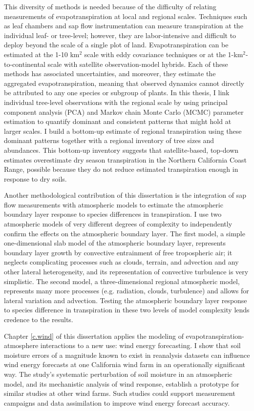 This diversity of methods is needed because of the difficulty of relating measurements of evapotranspiration at local and regional scales.  Techniques such as leaf chambers and sap flow instrumentation can measure transpiration at the individual leaf- or tree-level; however, they are labor-intensive and difficult to deploy beyond the scale of a single plot of land.  Evapotranspiration can be estimated at the 1-10 km$^2$ scale with eddy covariance techniques or at the 1-km$^2$-to-continental scale with satellite observation-model hybrids.  Each of these methods has associated uncertainties, and moreover, they estimate the aggregated evapotranspiration, meaning that observed dynamics cannot directly be attributed to any one species or subgroup of plants.  In this thesis, I link individual tree-level observations with the regional  scale by using principal component analysis (PCA) and Markov chain Monte Carlo (MCMC) parameter estimation to quantify dominant and consistent patterns that might hold at larger scales.  I build a bottom-up estimate of regional transpiration using these dominant patterns together with a regional inventory of tree sizes and abundances.  This bottom-up inventory suggests that satellite-based, top-down estimates overestimate dry season transpiration in the Northern California Coast Range, possible because they do not reduce estimated transpiration enough in response to dry soils.

Another methodological contribution of this dissertation is the integration of sap flow measurements with atmospheric models to estimate the atmospheric boundary layer response to species differences in transpiration.  I use two atmospheric models of very different degrees of complexity to independently confirm the effects on the atmospheric boundary layer.  The first model, a simple one-dimensional slab model of the atmospheric boundary layer, represents boundary layer growth by convective entrainment of free tropospheric air; it neglects complicating processes such as clouds, terrain, and advection and any other lateral heterogeneity, and its representation of convective turbulence is very simplistic.  The second model, a three-dimensional regional atmospheric model, represents many more processes (e.g. radiation, clouds, turbulence) and allows for lateral variation and advection.  Testing the atmospheric boundary layer response to species difference in transpiration in these two levels of model complexity lends credence to the results.

Chapter \ref{c.wind} of this dissertation applies the modeling of evapotranspiration-atmosphere interactions to a new use: wind energy forecasting.  I show that soil moisture errors of a magnitude known to exist in reanalysis datasets can influence wind energy forecasts at one California wind farm in an operationally significant way.  The study's systematic perturbation of soil moisture in an atmospheric model, and its mechanistic analysis of wind response, establish a prototype for similar studies at other wind farms.  Such studies could support measurement campaigns and data assimilation to improve wind energy forecast accuracy.

